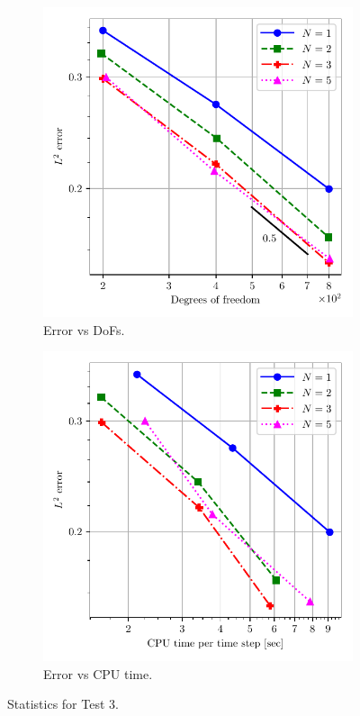 \documentclass[a4paper,11pt,oneside]{article}
\begin{document}
\begin{figure}[htbp]
	\centering
	\begin{subfigure}{0.5\linewidth}
		\includegraphics[width=\linewidth]{figures/riemann_1d/test1-3/error_vs_dof_chandrashekhar.pdf}
		\caption{Error vs DoFs.}
		\label{subfig:test1-3_error_vs_dof_chandrashekhar}
	\end{subfigure}%
	\begin{subfigure}{0.5\linewidth}
		\includegraphics[width=\linewidth]{figures/riemann_1d/test1-3/error_vs_cputime_chandrashekhar.pdf}
		\caption{Error vs CPU time.}
		\label{subfig:test1-3_error_vs_cputime_chandrashekhar}
	\end{subfigure}
	\caption{Statistics for Test 3.}
	\label{fig:test1-3_error_plots_chandrashekhar}
\end{figure}
\end{document}
